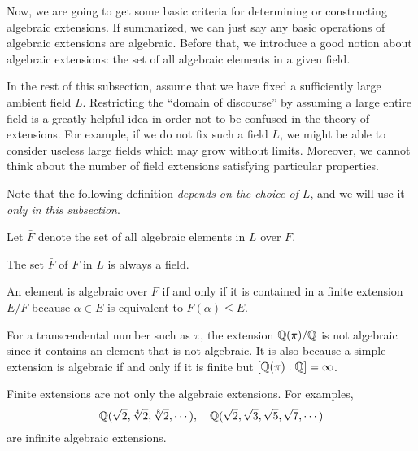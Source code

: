 \documentclass{../../large}
\begin{document}
Now, we are going to get some basic criteria for determining or constructing algebraic extensions.
If summarized, we can just say any basic operations of algebraic extensions are algebraic.
Before that, we introduce a good notion about algebraic extensions: the set of all algebraic elements in a given field.

In the rest of this subsection, assume that we have fixed a sufficiently large ambient field $L$.
Restricting the ``domain of discourse'' by assuming a large entire field is a greatly helpful idea in order not to be confused in the theory of extensions.
For example, if we do not fix such a field $L$, we might be able to consider useless large fields which may grow without limits.
Moreover, we cannot think about the number of field extensions satisfying particular properties.

Note that the following definition \emph{depends on the choice of $L$}, and we will use it \emph{only in this subsection}.
\begin{defn}
Let $\bar F$ denote the set of all algebraic elements in $L$ over $F$.
\end{defn}
\begin{prop}
The set $\bar F$ of $F$ in $L$ is always a field.
\end{prop}
\begin{pf}
An element is algebraic over $F$ if and only if it is contained in a finite extension $E/F$ because $\alpha\in E$ is equivalent to $F(\alpha)\le E$.

\end{pf}



\begin{ex}
For a transcendental number such as $\pi$, the extension $\mathbb{Q}(\pi)/\mathbb{Q}$ is not algebraic since it contains an element that is not algebraic.
It is also because a simple extension is algebraic if and only if it is finite but $[\mathbb{Q}(\pi):\mathbb{Q}]=\infty$.
\end{ex}

\begin{ex}
Finite extensions are not only the algebraic extensions.
For examples,
\[\mathbb{Q}(\sqrt2,\sqrt[4]2,\sqrt[8]2,\cdots),\quad\mathbb{Q}(\sqrt2,\sqrt3,\sqrt5,\sqrt7,\cdots)\]
are infinite algebraic extensions.
\end{ex}
\end{document}
